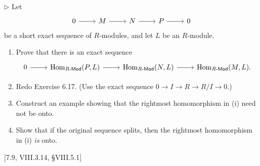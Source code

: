 \begin{problem}
	$\triangleright$ Let
	\[
		\begin{tikzcd}
			0
			\arrow[r]
			& M
			\arrow[r]
			& N
			\arrow[r]
			& P
			\arrow[r]
			& 0
		\end{tikzcd}
	\]
	be a short exact sequence of $R$-modules, and let $L$ be an $R$-module.
	\begin{enumerate}[label=(\roman*)]
		\item Prove that there is an exact sequence
		\[
			\begin{tikzcd}
				0
				\arrow[r]
				& \Hom_{\CRmod}(P, L)
				\arrow[r]
				& \Hom_{\CRmod}(N, L)
				\arrow[r]
				& \Hom_{\CRmod}(M, L) \text{.}
			\end{tikzcd}
		\]
		\item Redo Exercise 6.17. (Use the exact sequence $0 \to I \to R \to R/I \to 0$.)
		\item Construct an example showing that the rightmost homomorphism in (i) need not be onto.
		\item Show that if the original sequence splits, then the rightmost homomorphism in (i) \emph{is} onto.
	\end{enumerate}
	[7.9, VIII.3.14, \S VIII.5.1]
\end{problem}

